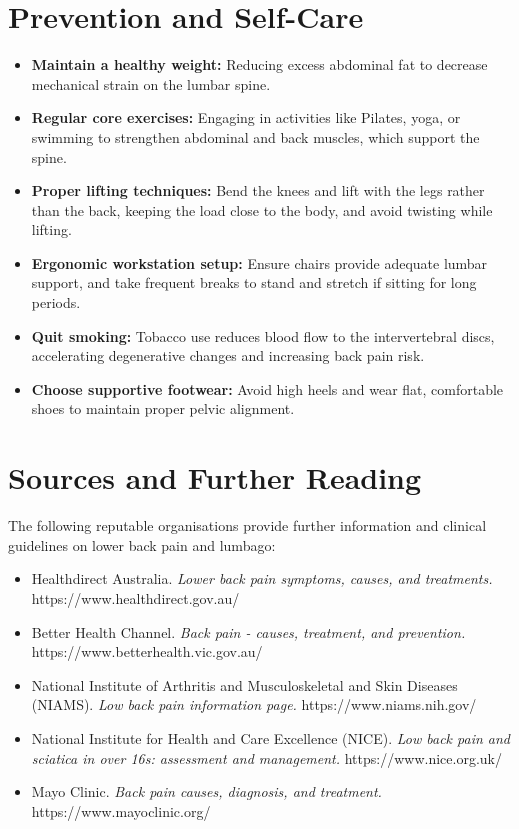 \section*{Prevention and Self-Care}
\begin{itemize}
    \item \textbf{Maintain a healthy weight:} Reducing excess abdominal fat to decrease mechanical strain on the lumbar spine.
    \item \textbf{Regular core exercises:} Engaging in activities like Pilates, yoga, or swimming to strengthen abdominal and back muscles, which support the spine.
    \item \textbf{Proper lifting techniques:} Bend the knees and lift with the legs rather than the back, keeping the load close to the body, and avoid twisting while lifting.
    \item \textbf{Ergonomic workstation setup:} Ensure chairs provide adequate lumbar support, and take frequent breaks to stand and stretch if sitting for long periods.
    \item \textbf{Quit smoking:} Tobacco use reduces blood flow to the intervertebral discs, accelerating degenerative changes and increasing back pain risk.
    \item \textbf{Choose supportive footwear:} Avoid high heels and wear flat, comfortable shoes to maintain proper pelvic alignment.
\end{itemize}

\section*{Sources and Further Reading}
The following reputable organisations provide further information and clinical guidelines on lower back pain and lumbago:
\begin{itemize}
    \item Healthdirect Australia. \textit{Lower back pain symptoms, causes, and treatments.} https://www.healthdirect.gov.au/
    \item Better Health Channel. \textit{Back pain - causes, treatment, and prevention.} https://www.betterhealth.vic.gov.au/
    \item National Institute of Arthritis and Musculoskeletal and Skin Diseases (NIAMS). \textit{Low back pain information page.} https://www.niams.nih.gov/
    \item National Institute for Health and Care Excellence (NICE). \textit{Low back pain and sciatica in over 16s: assessment and management.} https://www.nice.org.uk/
    \item Mayo Clinic. \textit{Back pain causes, diagnosis, and treatment.} https://www.mayoclinic.org/
\end{itemize}
